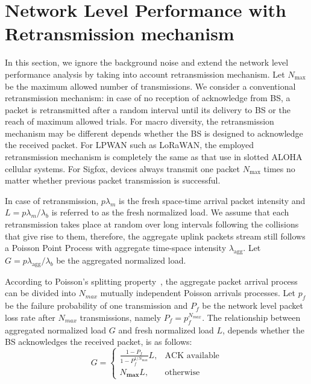 \section{Network Level Performance with Retransmission mechanism}
\label{sec:op_over_infinite_plane_with_retransmission}
In this section, we ignore the background noise and extend the network level performance analysis by taking into account retransmission mechanism. Let $N_{\text{max}}$ be the maximum allowed number of transmissions. We consider a conventional retransmission mechanism: in case of no reception of acknowledge from BS, a packet is retransmitted after a random interval until its delivery to BS or the reach of maximum allowed trials. For macro diversity, the retransmission mechanism may be different depends whether the BS is designed to acknowledge the received packet. For LPWAN such as LoRaWAN, the employed retransmission mechanism is completely the same as that use in slotted ALOHA cellular systems. For Sigfox, devices always transmit one packet $N_{\text{max}}$ times no matter whether previous packet transmission is successful.

In case of retransmission, $p\lambda_{m}$ is the fresh space-time arrival packet intensity and $L = p\lambda_{m}/\lambda_{b}$ is referred to as the fresh normalized load. We assume that each retransmission takes place at random over long intervals following the collisions that give rise to them, therefore, the aggregate uplink packets stream still follows a Poisson Point Process with aggregate time-space intensity $\lambda_{\text{agg}}$. Let $G = p\lambda_{\text{agg}}/\lambda_{b}$ be the aggregated normalized load. 

According to Poisson's splitting property~\cite{meyn2012markov}, the aggregate packet arrival process can be divided into $N_{max}$ mutually independent Poisson arrivals processes. Let $p_{f}$ be the failure probability of one transmission and $P_{f}$ be the network level packet loss rate after $N_{max}$ transmissions, namely $P_{f} =  p_f^{N_{max}} $. The relationship between aggregated normalized load $G$ and fresh normalized load $L$, depends whether the BS acknowledges the received packet, is as follows:
\begin{equation}
\label{eq:relationship_intensity_fresh_agg}
	G=
	\begin{cases}
	\frac{ 1-P_f }{1-P_f^{1/N_{\text{max}}}} L, & \text{ACK available} \\
	N_{\textbf{max}} L , & \text{otherwise}
	\end{cases}
\end{equation}

